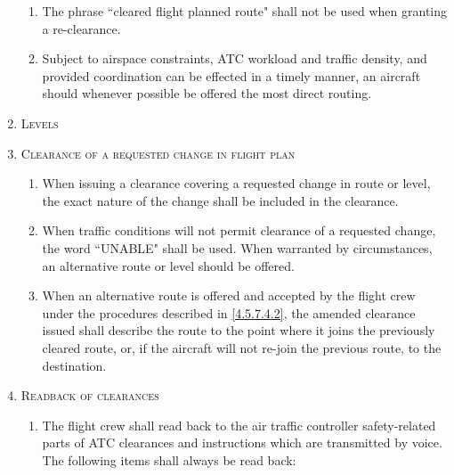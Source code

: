 \documentclass[../main.tex]{subfiles}
\begin{document}
\begin{enumerate}[itemsep=0.2cm]
\begin{enumerate}
            \item The phrase ``cleared flight planned route" shall not be used when granting a re-clearance.
            \item Subject to airspace constraints, ATC workload and traffic density, and provided coordination can be effected in a timely manner, an aircraft should whenever possible be offered the most direct routing.
        \end{enumerate}

        \item \textsc{Levels}

        \item \textsc{Clearance of a requested change in flight plan}
        \begin{enumerate}
            \item When issuing a clearance covering a requested change in route or level, the exact nature of the change shall be included in the clearance.
            \item \label{4.5.7.4.2} When traffic conditions will not permit clearance of a requested change, the word ``UNABLE" shall be used. When warranted by circumstances, an alternative route or level should be offered.
            \item When an alternative route is offered and accepted by the flight crew under the procedures described in \ref{4.5.7.4.2}, the amended clearance issued shall describe the route to the point where it joins the previously cleared route, or, if the aircraft will not re-join the previous route, to the destination.
        \end{enumerate}

        \item \textsc{Readback of clearances}
        \begin{enumerate}
            \item The flight crew shall read back to the air traffic controller safety-related parts of ATC clearances and instructions which are transmitted by voice. The following items shall always be read back:


\end{enumerate}
\end{enumerate}
\end{document}
